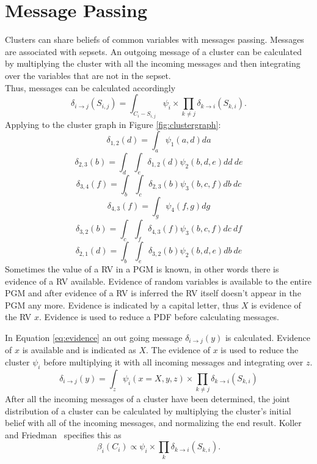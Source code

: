 \documentclass[12pt,oneside,openany,a4paper, %
afrikaans,english,
]{memoir}
\numberwithin{equation}{chapter}
\begin{document}
\section{Message Passing}
Clusters can share beliefs of common variables with messages passing. Messages are associated with sepsets. An outgoing message of a cluster can be calculated by multiplying the cluster with all the incoming messages and then integrating over the variables that are not in the sepset.
\\Thus, messages can be calculated accordingly~\citep{koller}
\begin{equation}
\delta_{i\to j}(S_{i,j}) = \int_{C_i - S_{i,j}}\psi_i \times \prod_{k\ne j} \delta_{k\to i}(S_{k,i}).
\end{equation}
Applying to the cluster graph in Figure \ref{fig:clustergraph}:
\begin{equation}\label{eq:del12}
\delta_{1,2}(d) = \int_a \psi_1(a,d)da
\end{equation}
\begin{equation}
\delta_{2,3}(b) = \int_d \int_e \delta_{1,2}(d)\psi_2(b,d,e)dd\ de
\end{equation}
\begin{equation}
\delta_{3,4}(f) = \int_b \int_c \delta_{2,3}(b)\psi_3(b,c,f)db\ dc
\end{equation}
\begin{equation}
\delta_{4,3}(f) = \int_g \psi_4(f,g)dg
\end{equation}
\begin{equation}
\delta_{3,2}(b) = \int_c \int_f \delta_{4,3}(f)\psi_3(b,c,f)dc\ df
\end{equation}
\begin{equation}
\delta_{2,1}(d) = \int_b \int_e \delta_{3,2}(b)\psi_2(b,d,e)db\ de
\end{equation}
Sometimes the value of a RV in a PGM is known, in other words there is evidence of a RV available. Evidence of random variables is available to the entire PGM and after evidence of a RV is inferred the RV itself doesn't appear in the PGM any more. Evidence is indicated by a capital letter, thus $X$ is evidence of the RV $x$. Evidence is used to reduce a PDF before calculating messages.

In Equation \ref{eq:evidence} an out going message $\delta_{i \to j}(y)$ is calculated. Evidence of $x$ is available and is indicated as $X$. The evidence of $x$ is used to reduce the cluster $\psi_i$ before multiplying it with all incoming messages and integrating over $z$.
\begin{equation}\label{eq:evidence}
\delta_{i\to j}(y) = \int_{z}\psi_i(x = X, y, z) \times \prod_{k\ne j} \delta_{k\to i}(S_{k,i})
\end{equation}
After all the incoming messages of a cluster have been determined, the joint distribution of a cluster can be calculated by multiplying the cluster's initial belief with all of the incoming messages, and normalizing the end result. Koller and Friedman~\cite{koller} specifies this as
\begin{equation}
\beta_i(C_i) \propto \psi_i \times \prod_{k} \delta_{k \to i}(S_{k,i}).
\end{equation}
\end{document}
